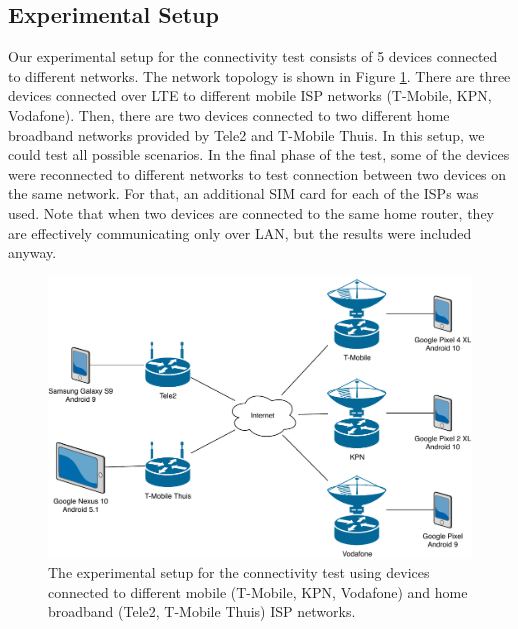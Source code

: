

\subsection{Experimental Setup}

Our experimental setup for the connectivity test consists of 5 devices connected to different networks. The network topology is shown in Figure \ref{experimental_setup}. There are three devices connected over LTE to different mobile ISP networks (T-Mobile, KPN, Vodafone). Then, there are two devices connected to two different home broadband networks provided by Tele2 and T-Mobile Thuis. In this setup, we could test all possible scenarios. In the final phase of the test, some of the devices were reconnected to different networks to test connection between two devices on the same network. For that, an additional SIM card for each of the ISPs was used. Note that when two devices are connected to the same home router, they are effectively communicating only over LAN, but the results were included anyway.

\begin{figure}[h!]
    \centering
    \includegraphics[width=1\textwidth]{diagrams/experimental-setup}
    \caption{The experimental setup for the connectivity test using devices connected to different mobile (T-Mobile, KPN, Vodafone) and home broadband (Tele2, T-Mobile Thuis) ISP networks.}
    \label{experimental_setup}
\end{figure}

